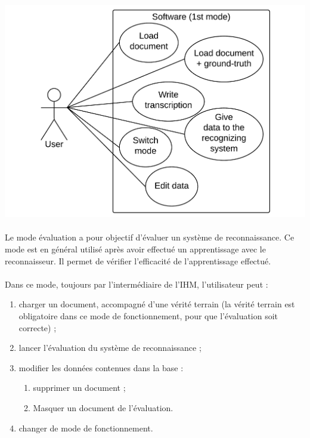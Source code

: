 \begin{mdframed}[frametitle={Figure 2 : Diagramme de cas d'utilisation (mode apprentissage)}, innerbottommargin=10]
\begin{center}
\includegraphics[scale=0.4]{Usecase_1.pdf}
\end{center}
\end{mdframed}

\paragraph{}

Le mode évaluation a pour objectif d’évaluer un système de reconnaissance. Ce
mode est en général utilisé après avoir effectué un apprentissage avec le
reconnaisseur. Il permet de vérifier l’efficacité de l’apprentissage effectué.

\paragraph{}

Dans ce mode, toujours par l’intermédiaire de l’IHM, l’utilisateur peut :
\begin{enumerate}
\item charger un document, accompagné d’une vérité terrain (la vérité terrain
est obligatoire dans ce mode de fonctionnement, pour que l’évaluation soit
correcte) ;
\item lancer l’évaluation du système de reconnaissance ;
\item modifier les données contenues dans la base :
\begin{enumerate}
\item supprimer un document ;
\item Masquer un document de l’évaluation.
\end{enumerate}
\item changer de mode de fonctionnement.
\end{enumerate}

